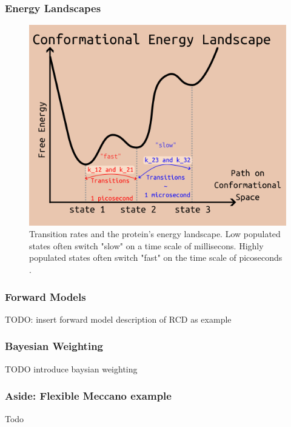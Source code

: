 \documentclass{beamer}
\begin{document}
\begin{frame}
\frametitle{Energy Landscapes}
\begin{figure}[h]
    \centering
    \includegraphics[scale=0.55]{energy-landscape.png}
    \caption{Transition rates and the protein's energy landscape.
        Low populated states often switch "slow" on a time scale of millisecons.
    Highly populated states often switch "fast" on the time scale of picoseconds \cite{bonomiDeterminationProteinStructural2019}. }
    \label{fig:min-bacteria}
\end{figure}

\end{frame}
\begin{frame}
\frametitle{Forward Models}
TODO: insert forward model description of RCD as example
\end{frame}

\begin{frame}
    \frametitle{Bayesian Weighting}
TODO introduce baysian weighting
\end{frame}


\begin{frame}
\frametitle{Aside: Flexible Meccano example}
Todo
\end{frame}
\end{document}
